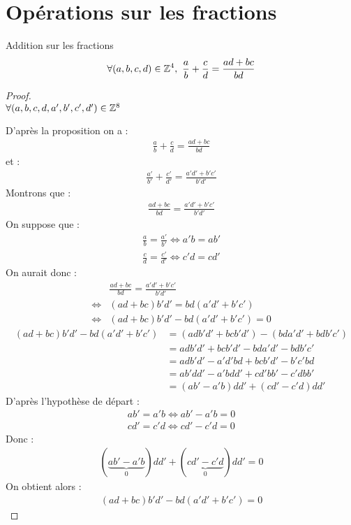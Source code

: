 \section{Opérations sur les fractions}
\begin{proposition}{Addition sur les fractions}
	\begin{align*}
		\forall (a, b, c, d) \in \mathbb{Z}^4,\ \frac{a}{b} + \frac{c}{d} = \frac{ad + bc}{bd}
	\end{align*}
\end{proposition}
\begin{proof}~
	\\
	$\forall (a, b, c, d, a', b', c', d') \in \mathbb{Z}^8$
	
	\noindent D'après la proposition on a :
	\begin{align*}
		\frac{a}{b} + \frac{c}{d} = \frac{ad + bc}{bd}
	\end{align*}
	et :
	\begin{align*}
		\frac{a'}{b'} + \frac{c'}{d'} = \frac{a'd' + b'c'}{b'd'}
	\end{align*}
	Montrons que : 
	\begin{align*}
		\frac{ad + bc}{bd} = \frac{a'd' + b'c'}{b'd'}
	\end{align*}
	On suppose que : 
	\begin{align*}
		\frac{a}{b} = \frac{a'}{b'} \iff a'b = ab' \\
		\frac{c}{d} = \frac{c'}{d'} \iff c'd = cd'
	\end{align*}
	On aurait donc :
	\begin{align*}
		&\frac{ad + bc}{bd} = \frac{a'd' + b'c'}{b'd'} \\
		\iff &(ad + bc)b'd' = bd(a'd' + b'c') \\
		\iff &(ad + bc)b'd' - bd(a'd' + b'c') = 0
	\end{align*}
	\begin{align*}
		(ad + bc)b'd' - bd(a'd' + b'c') &= (adb'd' + bcb'd') - (bda'd' + bdb'c')\\
		&= adb'd' + bcb'd' - bda'd' - bdb'c' \\
		&= adb'd' - a'd'bd + bcb'd' - b'c'bd \\
		&= ab'dd' - a'bdd' + cd'bb' - c'dbb' \\
		&= (ab' - a'b)dd' + (cd' - c'd)dd'
	\end{align*}
	D'après l'hypothèse de départ :
	\begin{align*}
		ab' = a'b \iff ab' - a'b = 0 \\
		cd' = c'd \iff cd' - c'd = 0
	\end{align*}
	Donc : 
	\begin{align*}
		(\underbrace{ab' - a'b}_{0})dd' + (\underbrace{cd' - c'd}_0)dd' = 0
	\end{align*}
	On obtient alors :
	\begin{align*}
		(ad + bc)b'd' - bd(a'd' + b'c') = 0
	\end{align*}
\end{proof}

